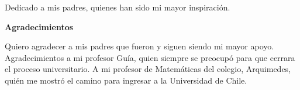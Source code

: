 

\newpage

	\begin{flushright}
	Dedicado a mis padres, quienes han sido mi mayor inspiración.
	\end{flushright}

\newpage

	\vspace{13cm}

	\huge
	\textbf{Agradecimientos}

		\normalsize
		Quiero agradecer a mis padres que fueron y siguen siendo mi mayor apoyo.
		Agradecimientos a mi profesor Guía, quien siempre se preocupó para que cerrara el proceso universitario.
		A mi profesor de Matemáticas del colegio, Arquimedes, quién me mostró el camino para ingresar a la Universidad de Chile.